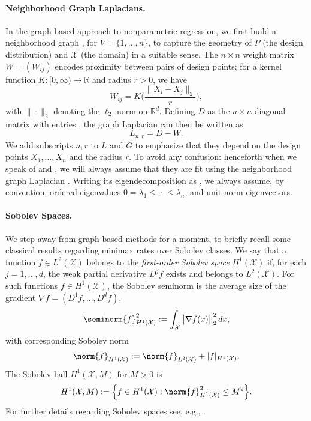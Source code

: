 \documentclass[twoside]{article}
\newcommand{\Reals}{\mathbb{R}}
\newcommand{\1}{\mathbf{1}}
\newcommand{\Rd}{\Reals^d}
\newcommand{\Lap}{L}
\newcommand{\Xset}{\mathcal{X}}
\newcommand{\Leb}{L}
\newcommand{\wh}[1]{\widehat{#1}}
\theoremstyle{definition}
\theoremstyle{remark}
\begin{document}
\paragraph{Neighborhood Graph Laplacians.}

In the graph-based approach to nonparametric regression, we first build a neighborhood graph , for $V=\{1,\ldots,n\}$, to capture the geometry of $P$ (the design distribution) and $\Xset$ (the domain) in a suitable sense. The $n \times n$ weight matrix $W = (W_{ij})$ encodes proximity between pairs of design points; for a kernel function $K: [0,\infty) \to \Reals$ and radius $r > 0$, we have
\begin{equation*}
\label{eqn:neighborhood_graph}
W_{ij} = K\Biggl(\frac{\|X_i - X_j\|_2}{r}\Biggr),
\end{equation*}
with $\|\cdot\|_2$ denoting the $\ell_2$ norm on $\Rd$. Defining $D$ as the $n \times n$ diagonal matrix with entries , the graph Laplacian can then be written as
\begin{equation}
\label{eqn:graph_Laplacian}
\Lap_{n,r} = D - W.
\end{equation}
We add subscripts $n,r$ to $\Lap$ and $G$ to emphasize that they depend on the design points $X_1,\ldots,X_n$ and the radius $r$. To avoid any confusion: henceforth when we speak of \smash{$\wh{f}$} and \smash{$\wh{T}$}, we will always assume that they are fit using the neighborhood graph Laplacian . Writing its eigendecomposition as , we always assume, by convention, ordered eigenvalues $0 = \lambda_1 \leq \cdots \leq \lambda_n$, and unit-norm eigenvectors. %

\paragraph{Sobolev Spaces.}

We step away from graph-based methods for a moment, to briefly recall some classical results regarding minimax rates over Sobolev classes. We say that a function $f \in \Leb^2(\Xset)$ belongs to the \emph{first-order Sobolev space} $H^1(\Xset)$ if, for each $j = 1,\ldots,d$, the weak partial derivative $D^j f$ exists and belongs to $\Leb^2(\Xset)$. For such functions $f \in H^1(\Xset)$, the Sobolev seminorm \smash{$\seminorm{f}_{H^{1}(\Xset)}$} is the average size of the gradient $\nabla f = (D^1 f, \ldots, D^d f)$, 
\begin{equation*}
\seminorm{f}_{H^1(\Xset)}^2 := \int_{\Xset} \bigl\|\nabla f(x)\bigr\|_2^2 \,dx,
\end{equation*}
with corresponding Sobolev norm 
\begin{equation*}
\norm{f}_{H^1(\Xset)} := \norm{f}_{\Leb^2(\Xset)} + |f|_{H^1(\Xset)}.
\end{equation*}
The Sobolev ball $H^1(\Xset,M)$ for $M > 0$ is
\begin{equation*}
H^1(\Xset,M) := \Bigl\{f \in H^1(\Xset): \norm{f}_{H^1(\Xset)}^2 \leq M^2\Bigr\}.
\end{equation*}
For further details regarding Sobolev spaces see, e.g., \citet{evans10,leoni2017}.
\end{document}

